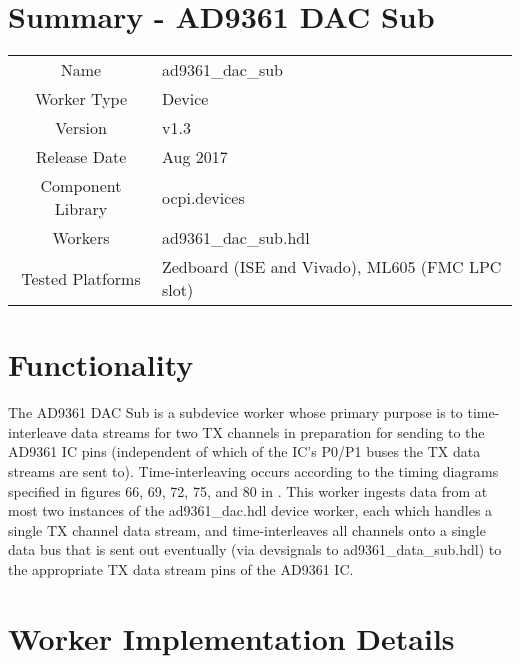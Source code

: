 \documentclass{article}
\author{} %
\date{Version \docVersion} %
\title{\docTitle}
\def\docVersion{1.3}
\def\comp{ad9361\_dac\_sub}
\def\Comp{AD9361 DAC Sub}
\begin{document}
\section*{Summary - \Comp}
\begin{tabular}{|c|M{13.5cm}|}
	\hline
	                  &                  \\
	\hline
	Name              & \comp            \\
	\hline
	Worker Type       & Device           \\
	\hline
	Version           & v\docVersion     \\
	\hline
	Release Date      & Aug 2017         \\
	\hline
	Component Library & ocpi.devices     \\
	\hline
	Workers           & \comp.hdl        \\
	\hline
	Tested Platforms  &  Zedboard (ISE and Vivado), ML605 (FMC LPC slot) \\
	\hline
\end{tabular}

\section*{Functionality}
	The \Comp{} is a subdevice worker whose primary purpose is to time-interleave data streams for two TX channels in preparation for sending to the AD9361 IC pins (independent of which of the IC's P0/P1 buses the TX data streams are sent to). Time-interleaving occurs according to the timing diagrams specified in figures 66, 69, 72, 75, and 80 in \cite{adi_ug570}. This worker ingests data from at most two instances of the ad9361\_dac.hdl device worker, each which handles a single TX channel data stream, and time-interleaves all channels onto a single data bus that is sent out eventually (via devsignals to ad9361\_data\_sub.hdl\cite{data_sub_comp_datasheet}) to the appropriate TX data stream pins of the AD9361 IC\cite{ad9361}.

\section*{Worker Implementation Details}
\end{document}
